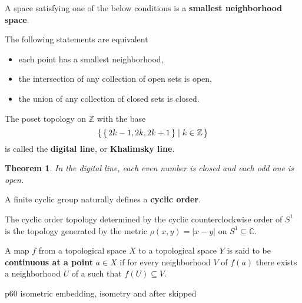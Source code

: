 \documentclass[12pt, letterpaper]{article}
\newcommand{\inte}{\mathbb{Z}}
\newcommand{\co}{\mathbb{C}}
\newcommand{\red}[1]{{\color{red} #1}}
\newcommand{\abs}[1]{\left\lvert #1 \right\rvert}
\newtheorem*{thm*}{Theorem}
\theoremstyle{definition}
\theoremstyle{remark}
\theoremstyle{definition}
\theoremstyle{plain}
\begin{document}
	
	\begin{def*}
		A space satisfying one of the below conditions is a \textbf{smallest neighborhood space}.
		
		The following statements are equivalent
		\begin{itemize}
			\item each point has a smallest neighborhood,
			\item the intersection of any collection of open sets is open,
			\item the union of any collection of closed sets is closed.
		\end{itemize}
	\end{def*}
	\begin{def*}
		The poset topology on $\inte$ with the base
		\[ \set{\set{2k-1,2k,2k+1}|k\in\inte}  \]
		is called
		the \textbf{digital line}, or \textbf{Khalimsky line}.
	\end{def*}
	\begin{thm*}
		In the digital line,
		each even number is closed and each odd one is open.
	\end{thm*}
	\begin{def*}
		A finite cyclic group naturally defines a \textbf{cyclic order}.
	\end{def*}

	The cyclic order topology determined by the cyclic counterclockwise
	order of $S^1$
	is the topology generated by the metric $\rho(x,y) = \abs{x - y}$ on
	$S^1 \subseteq\co$.
	
	\begin{def*}
		A map $f$ from a topological space $X$ to a topological space $Y$ is said to
		be \textbf{continuous at a point} $a \in X$ if for every neighborhood $V$ of $f(a)$ there
		exists a neighborhood $U$ of a such that $f(U) \subseteq V$.
	\end{def*}

	\red{p60 isometric embedding, isometry and after skipped}
	
	
\end{document}
